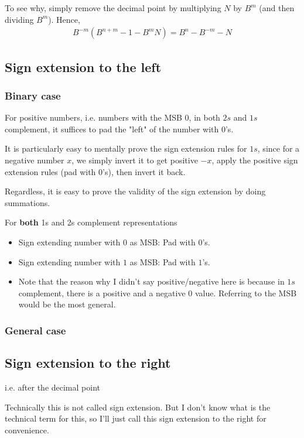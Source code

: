 \documentclass{article}
\begin{document}
To see why, simply remove the decimal point by multiplying $N$ by $B^m$ (and then dividing $B^m$).
Hence, \begin{align*}
	B^{-m}(B^{n+m} - 1 - B^mN) = B^n - B^{-m} - N
\end{align*}



\subsection{Sign extension to the left}
\subsubsection{Binary case}
For positive numbers, i.e. numbers with the MSB 0, in both $2s$ and $1s$ complement, it suffices to pad the "left" of the number with $0$'s.

It is particularly easy to mentally prove the sign extension rules for $1s$, since for a negative number $x$, we simply invert it to get positive $-x$, apply the positive sign extension rules (pad with $0$'s), then invert it back. 

Regardless, it is easy to prove the validity of the sign extension by doing summations.

For \textbf{both} 1s and 2s complement representations
\begin{itemize}
	\item Sign extending number with $0$ as MSB: Pad with $0$'s.
	\item Sign extending number with $1$ as MSB: Pad with $1$'s.
	\item Note that the reason why I didn't say positive/negative here is because in $1s$ complement, there is a positive and a negative $0$ value. Referring to the MSB would be the most general.
\end{itemize}

\subsubsection{General case}

\subsection{Sign extension to the right}
i.e. after the decimal point

Technically this is not called sign extension. But I don't know what is the technical term for this, so I'll just call this sign extension to the right for convenience.
\end{document}
